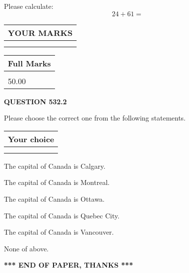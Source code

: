 \documentclass[12pt]{article}
\begin{document}
  
 
Please calculate:
\begin{equation}
24 +  %
61 = \nonumber
\end{equation}
 

 

 
  
\vspace{0.2in}
  
\noindent\begin{tabular}{|l|}
\hline
 YOUR MARKS  \\
\hline
 \\ 
 \\ 
\hline
\end{tabular}
\hspace{0.05in} \begin{tabular}{|l|}
\hline
 Full Marks  \\
\hline
 \\ 
50.00 \\
\hline
\end{tabular}
{\textbf{\Large{QUESTION
532.2 
}}}
  
  
Please choose the correct one from the following statements.
  
  
\noindent\hspace{3.0in} \begin{tabular}{|l|}
\hline
Your choice \\
\hline
 \\ 
 \\ 
\hline
\end{tabular}
  
  
 
 
The capital of Canada is Calgary.
 
 
The capital of Canada is Montreal.
 
 
The capital of Canada is Ottawa.
 
 
The capital of Canada is Quebec City.
 
 
The capital of Canada is Vancouver.
 
 
 None of above.
 
 
   
   
 \vspace{0.2in}
 
   
   
   
   
\vspace{1.0in} 
{\textbf{\large{ *** END OF PAPER, THANKS *** }}} 
   
\end{document}
